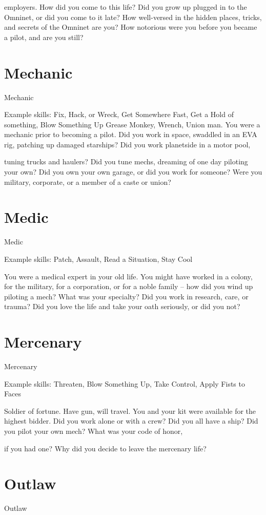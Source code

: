 employers. How did you come to this life? Did you grow up plugged in to the Omninet, or did you come to
it late? How well-versed in the hidden places, tricks, and secrets of the Omninet are you? How notorious
were you before you became a pilot, and are you still?

\section{Mechanic}
                                                   Mechanic

Example skills: Fix, Hack, or Wreck, Get Somewhere Fast, Get a Hold of something, Blow
Something Up
Grease Monkey, Wrench, Union man. You were a mechanic prior to becoming a pilot. Did you work in
space, swaddled in an EVA rig, patching up damaged starships? Did you work planetside in a motor pool,

tuning trucks and haulers? Did you tune mechs, dreaming of one day piloting your own? Did you own your
own garage, or did you work for someone? Were you military, corporate, or a member of a caste or union?
\section{Medic}
                                                      Medic

Example skills: Patch, Assault, Read a Situation, Stay Cool




You were a medical expert in your old life. You might have worked in a colony, for the military, for a
corporation, or for a noble family -- how did you wind up piloting a mech? What was your specialty? Did
you work in research, care, or trauma? Did you love the life and take your oath seriously, or did you not?
\section{Mercenary}
                                                    Mercenary

Example skills: Threaten, Blow Something Up, Take Control, Apply Fists to Faces

Soldier of fortune. Have gun, will travel. You and your kit were available for the highest bidder. Did you work
alone or with a crew? Did you all have a ship? Did you pilot your own mech? What was your code of honor,

if you had one? Why did you decide to leave the mercenary life?
\section{Outlaw}
                                                       Outlaw

